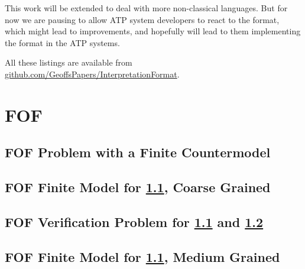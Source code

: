 \documentclass{easychair}
\begin{document}
This work will be extended to deal with more non-classical languages.
But for now we are pausing to allow ATP system developers to react to the format, which might 
lead to improvements, and hopefully will lead to them implementing the format in the ATP systems.



\newpage
\appendix

All these listings are available from
\href{https://github.com/GeoffsPapers/InterpretationFormat}{github.com/GeoffsPapers/InterpretationFormat}.

\section{FOF}
\label{FOF}

\subsection{FOF Problem with a Finite Countermodel}
\label{FOF_Finite.p}
\begin{small}

\end{small}

\newpage
\subsection{FOF Finite Model for \ref{FOF_Finite.p}, Coarse Grained}
\label{FOF_Finite.s}
\begin{small}

\end{small}

\newpage
\subsection{FOF Verification Problem for \ref{FOF_Finite.p} and \ref{FOF_Finite.s}}
\label{FOF_Finite.s.p}
\begin{small}

\end{small}

\newpage
\subsection{FOF Finite Model for \ref{FOF_Finite.p}, Medium Grained}
\label{FOF_Finite_Medium.s}
\begin{small}

\end{small}
\end{document}
